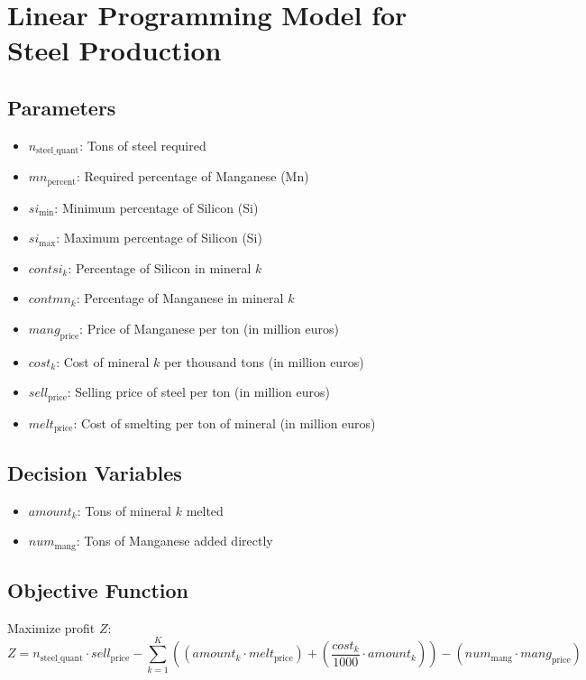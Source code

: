 \documentclass{article}
\begin{document}
\section*{Linear Programming Model for Steel Production}

\subsection*{Parameters}
\begin{itemize}
    \item $n_{\text{steel\_quant}}$: Tons of steel required
    \item $mn_{\text{percent}}$: Required percentage of Manganese (Mn)
    \item $si_{\text{min}}$: Minimum percentage of Silicon (Si)
    \item $si_{\text{max}}$: Maximum percentage of Silicon (Si)
    \item $contsi_k$: Percentage of Silicon in mineral $k$
    \item $contmn_k$: Percentage of Manganese in mineral $k$
    \item $mang_{\text{price}}$: Price of Manganese per ton (in million euros)
    \item $cost_k$: Cost of mineral $k$ per thousand tons (in million euros)
    \item $sell_{\text{price}}$: Selling price of steel per ton (in million euros)
    \item $melt_{\text{price}}$: Cost of smelting per ton of mineral (in million euros)
\end{itemize}

\subsection*{Decision Variables}
\begin{itemize}
    \item $amount_k$: Tons of mineral $k$ melted
    \item $num_{\text{mang}}$: Tons of Manganese added directly
\end{itemize}

\subsection*{Objective Function}
Maximize profit $Z$:
\[
Z = n_{\text{steel\_quant}} \cdot sell_{\text{price}} - \sum_{k=1}^{K} \left( \left(amount_k \cdot melt_{\text{price}}\right) + \left(\frac{cost_k}{1000} \cdot amount_k\right) \right) - (num_{\text{mang}} \cdot mang_{\text{price}})
\]
\end{document}
